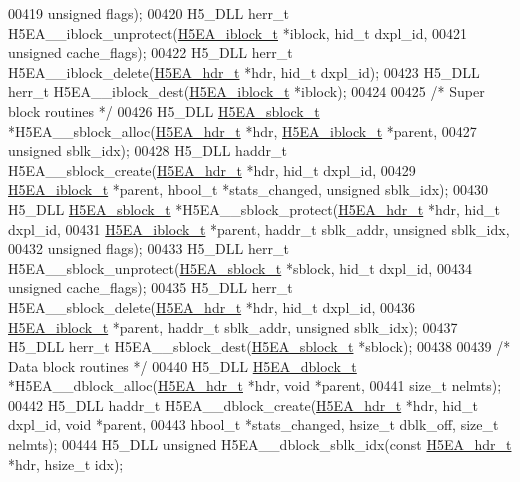 \begin{DoxyCode}
00419     \textcolor{keywordtype}{unsigned} flags);
00420 H5\_DLL herr\_t H5EA\_\_iblock\_unprotect(\hyperlink{struct_h5_e_a__iblock__t}{H5EA\_iblock\_t} *iblock, hid\_t dxpl\_id,
00421     \textcolor{keywordtype}{unsigned} cache\_flags);
00422 H5\_DLL herr\_t H5EA\_\_iblock\_delete(\hyperlink{struct_h5_e_a__hdr__t}{H5EA\_hdr\_t} *hdr, hid\_t dxpl\_id);
00423 H5\_DLL herr\_t H5EA\_\_iblock\_dest(\hyperlink{struct_h5_e_a__iblock__t}{H5EA\_iblock\_t} *iblock);
00424 
00425 \textcolor{comment}{/* Super block routines */}
00426 H5\_DLL \hyperlink{struct_h5_e_a__sblock__t}{H5EA\_sblock\_t} *H5EA\_\_sblock\_alloc(\hyperlink{struct_h5_e_a__hdr__t}{H5EA\_hdr\_t} *hdr, 
      \hyperlink{struct_h5_e_a__iblock__t}{H5EA\_iblock\_t} *parent,
00427     \textcolor{keywordtype}{unsigned} sblk\_idx);
00428 H5\_DLL haddr\_t H5EA\_\_sblock\_create(\hyperlink{struct_h5_e_a__hdr__t}{H5EA\_hdr\_t} *hdr, hid\_t dxpl\_id,
00429     \hyperlink{struct_h5_e_a__iblock__t}{H5EA\_iblock\_t} *parent, hbool\_t *stats\_changed, \textcolor{keywordtype}{unsigned} sblk\_idx);
00430 H5\_DLL \hyperlink{struct_h5_e_a__sblock__t}{H5EA\_sblock\_t} *H5EA\_\_sblock\_protect(\hyperlink{struct_h5_e_a__hdr__t}{H5EA\_hdr\_t} *hdr, hid\_t dxpl\_id,
00431     \hyperlink{struct_h5_e_a__iblock__t}{H5EA\_iblock\_t} *parent, haddr\_t sblk\_addr, \textcolor{keywordtype}{unsigned} sblk\_idx, 
00432     \textcolor{keywordtype}{unsigned} flags);
00433 H5\_DLL herr\_t H5EA\_\_sblock\_unprotect(\hyperlink{struct_h5_e_a__sblock__t}{H5EA\_sblock\_t} *sblock, hid\_t dxpl\_id,
00434     \textcolor{keywordtype}{unsigned} cache\_flags);
00435 H5\_DLL herr\_t H5EA\_\_sblock\_delete(\hyperlink{struct_h5_e_a__hdr__t}{H5EA\_hdr\_t} *hdr, hid\_t dxpl\_id,
00436     \hyperlink{struct_h5_e_a__iblock__t}{H5EA\_iblock\_t} *parent, haddr\_t sblk\_addr, \textcolor{keywordtype}{unsigned} sblk\_idx);
00437 H5\_DLL herr\_t H5EA\_\_sblock\_dest(\hyperlink{struct_h5_e_a__sblock__t}{H5EA\_sblock\_t} *sblock);
00438 
00439 \textcolor{comment}{/* Data block routines */}
00440 H5\_DLL \hyperlink{struct_h5_e_a__dblock__t}{H5EA\_dblock\_t} *H5EA\_\_dblock\_alloc(\hyperlink{struct_h5_e_a__hdr__t}{H5EA\_hdr\_t} *hdr, \textcolor{keywordtype}{void} *parent,
00441     \textcolor{keywordtype}{size\_t} nelmts);
00442 H5\_DLL haddr\_t H5EA\_\_dblock\_create(\hyperlink{struct_h5_e_a__hdr__t}{H5EA\_hdr\_t} *hdr, hid\_t dxpl\_id, \textcolor{keywordtype}{void} *parent,
00443     hbool\_t *stats\_changed, hsize\_t dblk\_off, \textcolor{keywordtype}{size\_t} nelmts);
00444 H5\_DLL \textcolor{keywordtype}{unsigned} H5EA\_\_dblock\_sblk\_idx(\textcolor{keyword}{const} \hyperlink{struct_h5_e_a__hdr__t}{H5EA\_hdr\_t} *hdr, hsize\_t idx);

\end{DoxyCode}
